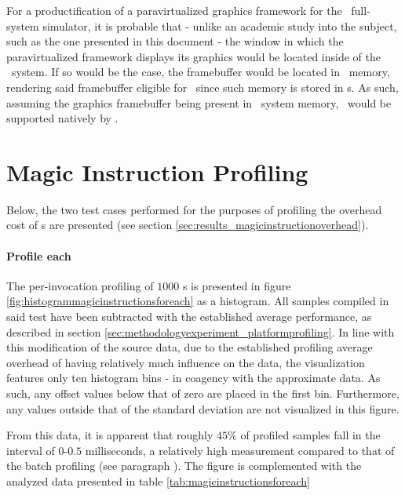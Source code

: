 For a productification of a paravirtualized graphics framework for the \dvttermsimics\ full-system simulator, it is probable that - unlike an academic study into the subject, such as the one presented in this document - the window in which the paravirtualized framework displays its graphics would be located inside of the \dvttermtarget\ system.
If so would be the case, the framebuffer would be located in \dvttermtarget\ memory, rendering said framebuffer eligible for \dvttermreverseexecution\ since such memory is stored in \dvttermcheckpoint s.
As such, assuming the graphics framebuffer being present in \dvttermtarget\ system memory, \dvttermreverseexecution\ would be supported natively by \dvttermsimics .

\section{Magic Instruction Profiling}
\label{sec:appendixa_magicinstructionprofiling}
Below, the two test cases performed for the purposes of profiling the overhead cost of \dvttermmagicinstruction s are presented (see section \ref{sec:results_magicinstructionoverhead}).

\paragraph{Profile each}
\label{par:results_magicinstructionoverhead_profileeach}
The per-invocation profiling of $1000$ \dvttermmagicinstruction s is presented in figure \ref{fig:histogrammagicinstructionsforeach} as a histogram.
All samples compiled in said test have been subtracted with the established average performance, as described in section \ref{sec:methodologyexperiment_platformprofiling}.
In line with this modification of the source data, due to the established profiling average overhead of  having relatively much influence on the data, the visualization features only ten histogram bins - in coagency with the approximate data.
As such, any offset values below that of zero are placed in the first bin.
Furthermore, any values outside that of the standard deviation are not visualized in this figure.



From this data, it is apparent that roughly $45\%$ of profiled samples fall in the interval of $0$-$0.5$ milliseconds, a relatively high measurement compared to that of the batch profiling (see paragraph ).
The figure is complemented with the analyzed data presented in table \ref{tab:magicinstructionsforeach}

